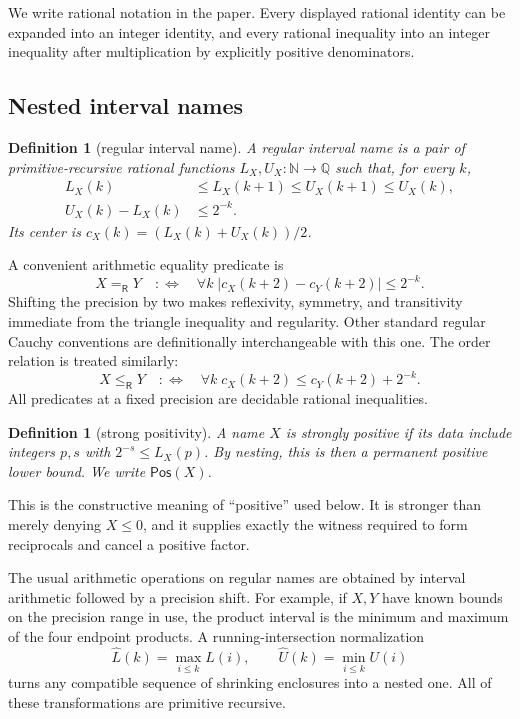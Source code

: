 \documentclass[11pt]{article}
\newtheorem{definition}[theorem]{Definition}
\newcommand{\N}{\mathbb N}
\newcommand{\Q}{\mathbb Q}
\newcommand{\Eq}{\mathrel{=_{\!\mathsf R}}}
\newcommand{\Le}{\mathrel{\le_{\!\mathsf R}}}
\newcommand{\Pos}{\mathsf{Pos}}
\newcommand{\abs}[1]{\left|#1\right|}
\begin{document}
We write rational notation in the paper.  Every displayed rational identity
can be expanded into an integer identity, and every rational inequality into
an integer inequality after multiplication by explicitly positive
denominators.

\subsection{Nested interval names}

\begin{definition}[regular interval name]
A \emph{regular interval name} is a pair of primitive-recursive rational
functions $L_X,U_X:\N\to\Q$ such that, for every $k$,
\begin{align*}
 L_X(k)&\le L_X(k+1)\le U_X(k+1)\le U_X(k),\\
 U_X(k)-L_X(k)&\le2^{-k}.
\end{align*}
Its center is $c_X(k)=(L_X(k)+U_X(k))/2$.
\end{definition}

A convenient arithmetic equality predicate is
\begin{equation}
 X\Eq Y\quad:\Longleftrightarrow\quad
 \forall k\;\abs{c_X(k+2)-c_Y(k+2)}\le2^{-k}.
 \label{eq:real-equality}
\end{equation}
Shifting the precision by two makes reflexivity, symmetry, and transitivity
immediate from the triangle inequality and regularity.  Other standard regular
Cauchy conventions are definitionally interchangeable with this one.  The
order relation is treated similarly:
\begin{equation}
 X\Le Y\quad:\Longleftrightarrow\quad
 \forall k\; c_X(k+2)\le c_Y(k+2)+2^{-k}.
 \label{eq:real-order}
\end{equation}
All predicates at a fixed precision are decidable rational inequalities.

\begin{definition}[strong positivity]
A name $X$ is \emph{strongly positive} if its data include integers $p,s$ with
$2^{-s}\le L_X(p)$.  By nesting, this is then a permanent positive lower
bound.  We write $\Pos(X)$.
\end{definition}

This is the constructive meaning of ``positive'' used below.  It is stronger
than merely denying $X\le0$, and it supplies exactly the witness required to
form reciprocals and cancel a positive factor.

The usual arithmetic operations on regular names are obtained by interval
arithmetic followed by a precision shift.  For example, if $X,Y$ have known
bounds on the precision range in use, the product interval is the minimum and
maximum of the four endpoint products.  A running-intersection normalization
\[
 \widehat L(k)=\max_{i\le k}L(i),\qquad
 \widehat U(k)=\min_{i\le k}U(i)
\]
turns any compatible sequence of shrinking enclosures into a nested one.  All
of these transformations are primitive recursive.
\end{document}
